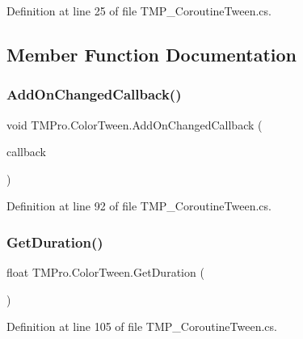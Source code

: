 Definition at line 25 of file T\+M\+P\+\_\+\+Coroutine\+Tween.\+cs.



\subsection{Member Function Documentation}
\mbox{\label{struct_t_m_pro_1_1_color_tween_a5a3af510dc44b3ad3c8973bb93197961}} 
\subsubsection{\texorpdfstring{AddOnChangedCallback()}{AddOnChangedCallback()}}
{\footnotesize\ttfamily void T\+M\+Pro.\+Color\+Tween.\+Add\+On\+Changed\+Callback (\begin{DoxyParamCaption}\item[{Unity\+Action$<$ Color $>$}]{callback }\end{DoxyParamCaption})}



Definition at line 92 of file T\+M\+P\+\_\+\+Coroutine\+Tween.\+cs.

\mbox{\label{struct_t_m_pro_1_1_color_tween_ad68d38055abd7079732e93a83746f30b}} 
\subsubsection{\texorpdfstring{GetDuration()}{GetDuration()}}
{\footnotesize\ttfamily float T\+M\+Pro.\+Color\+Tween.\+Get\+Duration (\begin{DoxyParamCaption}{ }\end{DoxyParamCaption})}



Definition at line 105 of file T\+M\+P\+\_\+\+Coroutine\+Tween.\+cs.

\mbox{\label{struct_t_m_pro_1_1_color_tween_a836616b26c0730957c7a2e1d340356fb}} 
